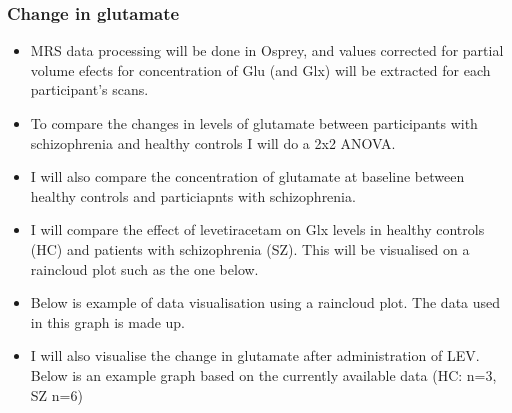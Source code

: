 \documentclass[
  letterpaper,
  DIV=11,
  numbers=noendperiod]{scrartcl}
\providecommand{\tightlist}{%
  \setlength{\itemsep}{0pt}\setlength{\parskip}{0pt}}\usepackage{longtable,booktabs,array}
\begin{document}
\subsubsection{Change in glutamate}\label{change-in-glutamate}

\begin{itemize}
\tightlist
\item
  MRS data processing will be done in Osprey, and values corrected for
  partial volume efects for concentration of Glu (and Glx) will be
  extracted for each participant's scans.
\item
  To compare the changes in levels of glutamate between participants
  with schizophrenia and healthy controls I will do a 2x2 ANOVA.
\item
  I will also compare the concentration of glutamate at baseline between
  healthy controls and particiapnts with schizophrenia.
\item
  I will compare the effect of levetiracetam on Glx levels in healthy
  controls (HC) and patients with schizophrenia (SZ). This will be
  visualised on a raincloud plot such as the one below.
\item
  Below is example of data visualisation using a raincloud plot. The
  data used in this graph is made up.
\item
  I will also visualise the change in glutamate after administration of
  LEV. Below is an example graph based on the currently available data
  (HC: n=3, SZ n=6)
\end{itemize}
\end{document}

